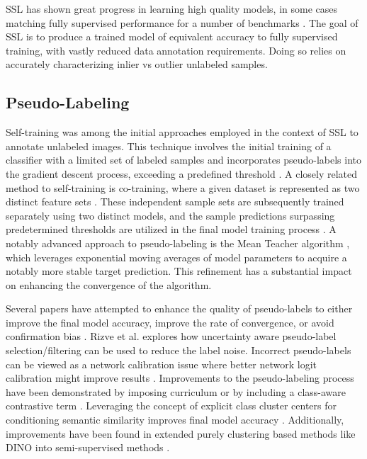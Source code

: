 \documentclass[10pt,twocolumn,letterpaper]{article}
\begin{document}

SSL has shown great progress in learning high quality models, in some cases matching fully supervised performance for a number of benchmarks \cite{zhang2021flexmatch}.
The goal of SSL is to produce a trained model of equivalent accuracy to fully supervised training, with vastly reduced data annotation requirements.
Doing so relies on accurately characterizing inlier vs outlier unlabeled samples.

\subsection{Pseudo-Labeling}
Self-training was among the initial approaches employed in the context of SSL to annotate unlabeled images. 
This technique involves the initial training of a classifier with a limited set of labeled samples and incorporates pseudo-labels into the gradient descent process, exceeding a predefined threshold \cite{yarowsky1995unsupervised, mcclosky2006reranking, olivier2006semi,zhai2019s4l,livieris2019predicting,rosenberg2005semi,menon2020deep}. 
A closely related method to self-training is co-training, where a given dataset is represented as two distinct feature sets \cite{blum1998combining}. 
These independent sample sets are subsequently trained separately using two distinct models, and the sample predictions surpassing predetermined thresholds are utilized in the final model training process \cite{blum1998combining,prakash2014survey}.
A notably advanced approach to pseudo-labeling is the Mean Teacher algorithm \cite{tarvainen2017mean}, which leverages exponential moving averages of model parameters to acquire a notably more stable target prediction. 
This refinement has a substantial impact on enhancing the convergence of the algorithm.

Several papers have attempted to enhance the quality of pseudo-labels to either improve the final model accuracy, improve the rate of convergence, or avoid confirmation bias \cite{arazo2020pseudo}.
Rizve et al. \cite{rizve2021defense} explores how uncertainty aware pseudo-label selection/filtering can be used to reduce the label noise.
Incorrect pseudo-labels can be viewed as a network calibration issue \cite{rizve2021defense} where better network logit calibration might improve results \cite{Xing2020DistanceBased}.
Improvements to the pseudo-labeling process have been demonstrated by imposing curriculum \cite{zhang2021flexmatch} or by including a class-aware contrastive term \cite{yang2022class}.
Leveraging the concept of explicit class cluster centers for conditioning semantic similarity improves final model accuracy \cite{zheng2022simmatch}.
Additionally, improvements have been found in extended purely clustering based methods like DINO \cite{caron2021emerging} into semi-supervised methods \cite{fini2023semi}.
\end{document}
